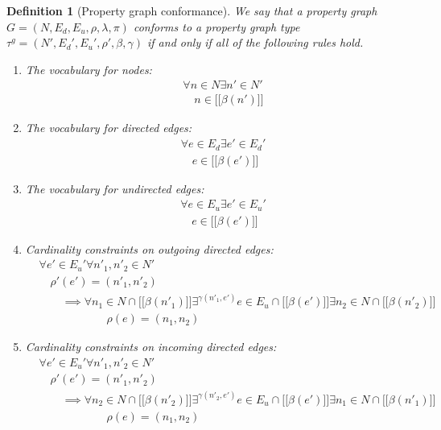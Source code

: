 \documentclass[a4paper]{article}
\newtheorem{definition}[theorem]{Definition}
\newcommand{\gtype}{\tau^g}
\newcommand{\lsem}{\ensuremath{[\![}}
\newcommand{\rsem}{\ensuremath{]\!]}}
\newcommand{\sem}[1]{\ensuremath{\lsem #1 \rsem}}
\begin{document}
\begin{definition}[Property graph conformance]
  We say that a property graph $G = (N, E_d, E_u, \rho, \lambda, \pi)$ \emph{conforms} to a property graph type $\gtype = (N', E_d', E_u', \rho', \beta, \gamma)$ if and only if all of the following rules hold.

  \begin{enumerate}
    \item The vocabulary for nodes:
    \begin{align*}
      &\forall n \in N \exists n' \in N'\\
      &\quad n \in \sem{\beta(n')}
    \end{align*}
    
    \item The vocabulary for directed edges:
    \begin{align*}
      &\forall e \in E_d \exists e' \in E_d'\\
      &\quad e \in \sem{\beta(e')}
    \end{align*}

    \item The vocabulary for undirected edges:
    \begin{align*}
      &\forall e \in E_u \exists e' \in E_u'\\
      &\quad e \in \sem{\beta(e')}
    \end{align*}
    
    \item Cardinality constraints on outgoing directed edges:
    \begin{align*}
      &\forall e' \in E_u' \forall n'_1, n'_2 \in N'\\
      &\quad\rho'(e') = (n'_1, n'_2)\\
      &\quad\quad\implies {} \forall n_1 \in N \cap \sem{\beta(n'_1)} \exists^{\gamma(n'_1, e')} e \in E_u \cap \sem{\beta(e')} \exists n_2 \in N \cap \sem{\beta(n'_2)}\\
      &\quad\quad\quad\quad\quad\quad\rho(e) = (n_1, n_2)
    \end{align*}

    \item Cardinality constraints on incoming directed edges:
    \begin{align*}
      &\forall e' \in E_u' \forall n'_1, n'_2 \in N'\\
      &\quad\rho'(e') = (n'_1, n'_2)\\
      &\quad\quad\implies {} \forall n_2 \in N \cap \sem{\beta(n'_2)} \exists^{\gamma(n'_2, e')} e \in E_u \cap \sem{\beta(e')} \exists n_1 \in N \cap \sem{\beta(n'_1)}\\
      &\quad\quad\quad\quad\quad\quad\rho(e) = (n_1, n_2)
    \end{align*}
    

\end{enumerate}
\end{definition}
\end{document}
